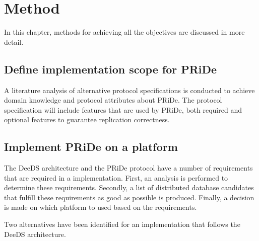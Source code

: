 
\section{Method} %
\label{sec:method}

In this chapter, methods for achieving all the objectives are discussed in more detail.

\subsection{Define implementation scope for PRiDe} 
\label{subsec:impl_bound}

A literature analysis of alternative protocol specifications is conducted to achieve domain knowledge and protocol attributes about PRiDe. The protocol specification will include features that are used by PRiDe, both required and optional features to guarantee replication correctness. 

\subsection{Implement PRiDe on a  platform} 
\label{subsec:create_implementation}

The DeeDS architecture and the PRiDe protocol have a number of requirements that are required in a implementation. 
First, an analysis is performed to determine these requirements. Secondly, a list of distributed database candidates that fulfill these requirements as good as possible is produced. Finally, a decision is made on which platform to used based on the requirements.

Two alternatives have been identified for an implementation that follows the DeeDS architecture.

